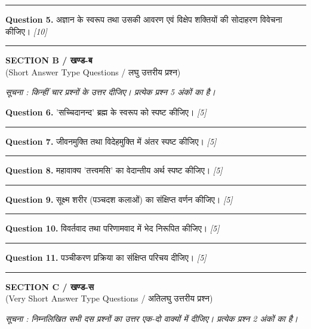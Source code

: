 \documentclass[11pt,a4paper]{article}
\newcommand{\pts}[1]{\hfill \textit{[#1]}}
\begin{document}
\medskip\rule{\linewidth}{0.2pt}\medskip

\noindent \textbf{Question 5.} अज्ञान के स्वरूप तथा उसकी आवरण एवं विक्षेप शक्तियों की सोदाहरण विवेचना कीजिए। \pts{10}

\bigskip
\rule{\linewidth}{0.2pt}
\bigskip

\begin{center}
  {\large\bfseries SECTION B / खण्ड-ब}\\[2pt]
  {\normalsize (Short Answer Type Questions / लघु उत्तरीय प्रश्न)}
\end{center}

\noindent \textit{सूचना : किन्हीं चार प्रश्नों के उत्तर दीजिए। प्रत्येक प्रश्न 5 अंकों का है।}\\[2pt]

\bigskip

\noindent \textbf{Question 6.} 'सच्चिदानन्द' ब्रह्म के स्वरूप को स्पष्ट कीजिए। \pts{5}

\medskip\rule{\linewidth}{0.2pt}\medskip

\noindent \textbf{Question 7.} जीवनमुक्ति तथा विदेहमुक्ति में अंतर स्पष्ट कीजिए। \pts{5}

\medskip\rule{\linewidth}{0.2pt}\medskip

\noindent \textbf{Question 8.} महावाक्य 'तत्त्वमसि' का वेदान्तीय अर्थ स्पष्ट कीजिए। \pts{5}

\medskip\rule{\linewidth}{0.2pt}\medskip

\noindent \textbf{Question 9.} सूक्ष्म शरीर (पञ्चदश कलाओं) का संक्षिप्त वर्णन कीजिए। \pts{5}

\medskip\rule{\linewidth}{0.2pt}\medskip

\noindent \textbf{Question 10.} विवर्तवाद तथा परिणामवाद में भेद निरूपित कीजिए। \pts{5}

\medskip\rule{\linewidth}{0.2pt}\medskip

\noindent \textbf{Question 11.} पञ्चीकरण प्रक्रिया का संक्षिप्त परिचय दीजिए। \pts{5}

\bigskip
\rule{\linewidth}{0.2pt}
\bigskip

\begin{center}
  {\large\bfseries SECTION C / खण्ड-स}\\[2pt]
  {\normalsize (Very Short Answer Type Questions / अतिलघु उत्तरीय प्रश्न)}
\end{center}

\noindent \textit{सूचना : निम्नलिखित सभी दस प्रश्नों का उत्तर एक-दो वाक्यों में दीजिए। प्रत्येक प्रश्न 2 अंकों का है।}\\[2pt]
\end{document}
